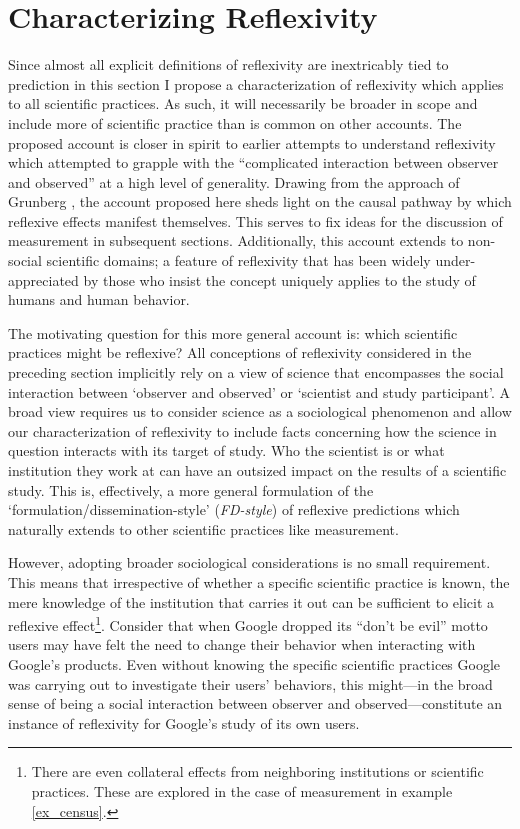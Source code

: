 \section{Characterizing Reflexivity}\label{sec_character}

Since almost all explicit definitions of reflexivity are inextricably tied to prediction in this section I propose a characterization of reflexivity which applies to all scientific practices. As such, it will necessarily be broader in scope and include more of scientific practice than is common on other accounts. The proposed account is closer in spirit to earlier attempts to understand reflexivity which attempted to grapple with the ``complicated interaction between observer and observed'' \autocite[p14]{popper1953} at a high level of generality. Drawing from the approach of Grunberg \autocite*{grunberg1986}, the account proposed here sheds light on the causal pathway by which reflexive effects manifest themselves. This serves to fix ideas for the discussion of measurement in subsequent sections. Additionally, this account extends to non-social scientific domains; a feature of reflexivity that has been widely under-appreciated by those who insist the concept uniquely applies to the study of humans and human behavior.

The motivating question for this more general account is: which scientific practices might be reflexive? All conceptions of reflexivity considered in the preceding section implicitly rely on a view of science that encompasses the social interaction between `observer and observed' \autocite{popper1953} or `scientist and study participant'\autocite{gergen1973, luce95}. A broad view requires us to consider science as a sociological phenomenon and allow our characterization of reflexivity to include facts concerning how the science in question interacts with its target of study. Who the scientist is or what institution they work at can have an outsized impact on the results of a scientific study. This is, effectively, a more general formulation of the `formulation/dissemination-style' (\textit{FD-style}) of reflexive predictions \autocite{romanos1973} which naturally extends to other scientific practices like measurement.

However, adopting broader sociological considerations is no small requirement. This means that irrespective of whether a specific scientific practice is known, the mere knowledge of the institution that carries it out can be sufficient to elicit a reflexive effect\footnote{There are even collateral effects from neighboring institutions or scientific practices. These are explored in the case of measurement in example \ref{ex_census}.}. Consider that when Google dropped its ``don't be evil'' motto \autocite{basu2015} users may have felt the need to change their behavior when interacting with Google's products. Even without knowing the specific scientific practices Google was carrying out to investigate their users' behaviors, this might---in the broad sense of being a social interaction between observer and observed---constitute an instance of reflexivity for Google's study of its own users.

